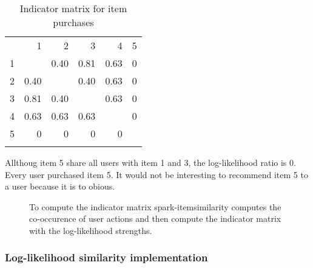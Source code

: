 \begin{table}
  \centering
\begin{center}
\begin{tabular}{rrrrrr}
  & 1 & 2 & 3 & 4 & 5\\
1 &   & 0.40 & 0.81 & 0.63 & 0\\
2 & 0.40 &  & 0.40 & 0.63 & 0\\
3 & 0.81 & 0.40 &  & 0.63 & 0\\
4 & 0.63 & 0.63 & 0.63 &  & 0\\
5 & 0 & 0 & 0 & 0 & \\
 &  &  &  &  & \\
\end{tabular}
\end{center}
  \caption{Indicator matrix for item purchases}
  \label{tab:indicatormatrix}
\end{table}

Allthoug item 5 share all users with item 1 and 3, the log-likelihood ratio is 0. Every user purchased item 5. It would not be interesting to recommend item 5 to a user because it is to obious.

\begin{figure}
\centering
{}
\caption{To compute the indicator matrix {\ttfamily spark-itemsimilarity} computes the co-occurence  of user actions and then compute the indicator matrix with the log-likelihood strengths.}
\end{figure}


\subsubsection{Log-likelihood similarity implementation}
\label{sec:llrimpl}

